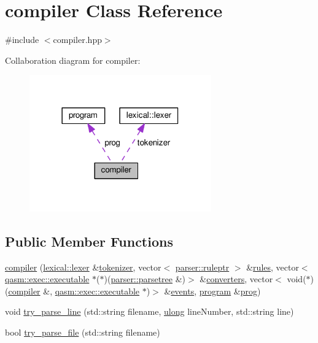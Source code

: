 \hypertarget{classcompiler}{}\section{compiler Class Reference}
\label{classcompiler}


{\ttfamily \#include $<$compiler.\+hpp$>$}



Collaboration diagram for compiler\+:\nopagebreak
\begin{figure}[H]
\begin{center}
\leavevmode
\includegraphics[width=222pt]{classcompiler__coll__graph}
\end{center}
\end{figure}
\subsection*{Public Member Functions}
\begin{DoxyCompactItemize}
\item 
\hyperlink{classcompiler_aac603e3e8c3851dfb420e6e007adbad0}{compiler} (\hyperlink{classlexical_1_1lexer}{lexical\+::lexer} \&\hyperlink{classcompiler_a888ac16dbb82fa8a9500633addcd22ba}{tokenizer}, vector$<$ \hyperlink{namespaceparser_a85b2df48287fddaca144a5f6c01b4761}{parser\+::ruleptr} $>$ \&\hyperlink{classcompiler_a1b712963929882f359df919ce73bbf4e}{rules}, vector$<$ \hyperlink{classqasm_1_1exec_1_1executable}{qasm\+::exec\+::executable} $\ast$($\ast$)(\hyperlink{structparser_1_1parsetree}{parser\+::parsetree} \&)$>$ \&\hyperlink{classcompiler_a76cbb22ce5238f2fd9b3946f541dba0c}{converters}, vector$<$ void($\ast$)(\hyperlink{classcompiler}{compiler} \&, \hyperlink{classqasm_1_1exec_1_1executable}{qasm\+::exec\+::executable} $\ast$)$>$ \&\hyperlink{classcompiler_aa9d1b362adff0ca48511cf824ca1fe4c}{events}, \hyperlink{classprogram}{program} \&\hyperlink{classcompiler_a801700690bf711169679cb6ca890168a}{prog})
\item 
void \hyperlink{classcompiler_a9b61ba6cc57763a9e76feb44fffd1616}{try\+\_\+parse\+\_\+line} (std\+::string filename, \hyperlink{types_8h_ab2bb0e5480d1d957383df6b350794313}{ulong} line\+Number, std\+::string line)
\item 
bool \hyperlink{classcompiler_af3984a0a53279c28bee8aee4b0ef84ca}{try\+\_\+parse\+\_\+file} (std\+::string filename)
\end{DoxyCompactItemize}
